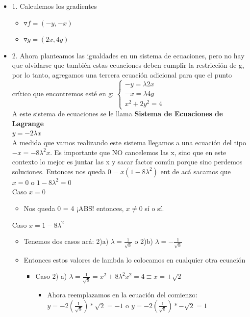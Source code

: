 \documentclass[10pt,a4paper]{article}
\begin{document}
\begin{itemize}
    \item 1. Calculemos los gradientes
    \begin{itemize}
        \item  $\triangledown f = (-y, -x)$
        \item $\triangledown g = (2x, 4y)$
    \end{itemize}
    \item 2. Ahora planteamos las igualdades en un sistema de ecuaciones, pero no hay que olvidarse que también estas ecuaciones deben cumplir la restricción de g, por lo tanto, agregamos una tercera ecuación adicional para que el punto crítico que encontremos esté en g: 
        $\begin{cases} 
            -y = \lambda 2x \\
            -x = \lambda 4 y \\
            x^{2} + 2y^{2} = 4
        \end{cases}$ \\
    A este sistema de ecuaciones se le llama \textbf{Sistema de Ecuaciones de Lagrange} \\
    $y = -2 \lambda x$ \\
    A medida que vamos realizando este sistema llegamos a una ecuación del tipo $-x = -8 \lambda^{2} x$. Es importante que NO cancelemos las x, sino que en este contexto lo mejor es juntar las x y sacar factor común porque sino perdemos soluciones. Entonces nos queda $0 = x(1-8\lambda^{2})$ ent de acá sacamos que $x = 0$ o $1-8\lambda^{2} = 0$ \\
    Caso $x = 0$
        \begin{itemize}
            \item Nos queda 0 = 4 ¡ABS! entonces, $x \neq 0$ sí o sí.
        \end{itemize}
    Caso $x = 1-8\lambda^{2}$
        \begin{itemize}
            \item Tenemos dos casos acá: 2)a) $ \lambda = \frac{1}{\sqrt{8}}$ o 2)b) $\lambda = -\frac{1}{\sqrt{8}}$
            \item Entonces estos valores de lambda lo colocamos en cualquier otra ecuación
            \begin{itemize}
                \item Caso 2) a) $\lambda = \frac{1}{\sqrt{8}} = x^{2} + 8\lambda^{2}x^{2} = 4 \equiv x = \pm \sqrt{2}$
                \begin{itemize}
                    \item Ahora reemplazamos en la ecuación del comienzo: $ y = -2(\frac{1}{\sqrt{8}}) * \sqrt{2} = -1 $ o $y = -2(\frac{1}{\sqrt{8}}) * -\sqrt{2} = 1$

\end{itemize}
\end{itemize}
\end{itemize}
\end{itemize}
\end{document}
